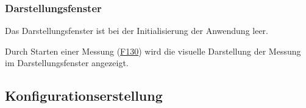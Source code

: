\documentclass[parskip=full]{scrartcl}
\begin{document}
\subsubsection{Darstellungsfenster}

\begin{description}
\hypertarget{link-f140}{\item[F140]} Das Darstellungsfenster ist bei der Initialisierung der Anwendung leer.
\hypertarget{link-f150}{\item[F150]} Durch Starten einer Messung (\hyperlink{link-f130}{F130}) wird die visuelle Darstellung der Messung im Darstellungsfenster angezeigt.
\end{description}



\subsection{Konfigurationserstellung}
\end{document}
